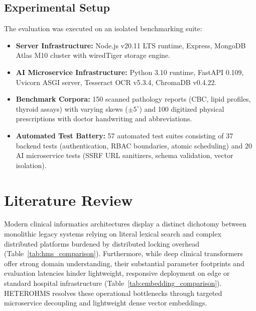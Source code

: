 \documentclass[conference]{IEEEtran}
\begin{document}
\subsection{Experimental Setup}
The evaluation was executed on an isolated benchmarking suite:
\begin{itemize}
    \item \textbf{Server Infrastructure:} Node.js v20.11 LTS runtime, Express, MongoDB Atlas M10 cluster with wiredTiger storage engine.
    \item \textbf{AI Microservice Infrastructure:} Python 3.10 runtime, FastAPI 0.109, Uvicorn ASGI server, Tesseract OCR v5.3.4, ChromaDB v0.4.22.
    \item \textbf{Benchmark Corpora:} 150 scanned pathology reports (CBC, lipid profiles, thyroid assays) with varying skews ($\pm 5^\circ$) and 100 digitized physical prescriptions with doctor handwriting and abbreviations.
    \item \textbf{Automated Test Battery:} 57 automated test suites consisting of 37 backend tests (authentication, RBAC boundaries, atomic scheduling) and 20 AI microservice tests (SSRF URL sanitizers, schema validation, vector isolation).
\end{itemize}

\section{Literature Review}
Modern clinical informatics architectures display a distinct dichotomy between monolithic legacy systems relying on literal lexical search and complex distributed platforms burdened by distributed locking overhead (Table~\ref{tab:hms_comparison}). Furthermore, while deep clinical transformers offer strong domain understanding, their substantial parameter footprints and evaluation latencies hinder lightweight, responsive deployment on edge or standard hospital infrastructure (Table~\ref{tab:embedding_comparison}). HETEROHMS resolves these operational bottlenecks through targeted microservice decoupling and lightweight dense vector embeddings.
\end{document}
